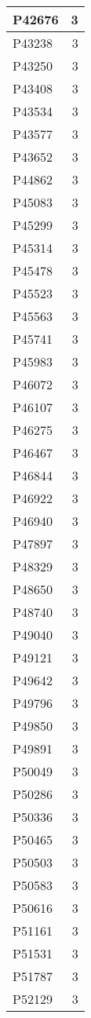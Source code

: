 \documentclass[
]{book}
\theoremstyle{definition}
\theoremstyle{definition}
\theoremstyle{definition}
\theoremstyle{definition}
\theoremstyle{remark}
\begin{document}
\begin{table}
\begin{tabular}{l|r}
\hline
P42676 & 3\\
\hline
P43238 & 3\\
\hline
P43250 & 3\\
\hline
P43408 & 3\\
\hline
P43534 & 3\\
\hline
P43577 & 3\\
\hline
P43652 & 3\\
\hline
P44862 & 3\\
\hline
P45083 & 3\\
\hline
P45299 & 3\\
\hline
P45314 & 3\\
\hline
P45478 & 3\\
\hline
P45523 & 3\\
\hline
P45563 & 3\\
\hline
P45741 & 3\\
\hline
P45983 & 3\\
\hline
P46072 & 3\\
\hline
P46107 & 3\\
\hline
P46275 & 3\\
\hline
P46467 & 3\\
\hline
P46844 & 3\\
\hline
P46922 & 3\\
\hline
P46940 & 3\\
\hline
P47897 & 3\\
\hline
P48329 & 3\\
\hline
P48650 & 3\\
\hline
P48740 & 3\\
\hline
P49040 & 3\\
\hline
P49121 & 3\\
\hline
P49642 & 3\\
\hline
P49796 & 3\\
\hline
P49850 & 3\\
\hline
P49891 & 3\\
\hline
P50049 & 3\\
\hline
P50286 & 3\\
\hline
P50336 & 3\\
\hline
P50465 & 3\\
\hline
P50503 & 3\\
\hline
P50583 & 3\\
\hline
P50616 & 3\\
\hline
P51161 & 3\\
\hline
P51531 & 3\\
\hline
P51787 & 3\\
\hline
P52129 & 3\\

\end{tabular}
\end{table}
\end{document}
